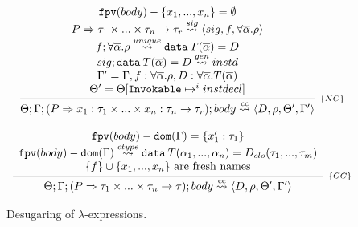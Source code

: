 \documentclass[a4paper, 11pt]{article}
\begin{document}
\begin{figure}[H]
  \[
    \begin{array}{c}
      \infer[_{\{NC\}}]
            {\Theta;\Gamma;(P \Rightarrow x_1 : \tau_1\times ... \times x_n : \tau_n \to \tau_r); body \cc \langle D, \rho, \Theta', \Gamma' \rangle}
            {\begin{array}{c}
              \fpv(body) - \{x_1, ...,x_n \} = \emptyset\\
              P \Rightarrow \tau_1\times ... \times \tau_n \to \tau_r \sig \langle sig, f, \forall \overline{\alpha} . \rho \rangle\\ 
              f ; \forall \overline{\alpha}. \rho \unique \mathtt{data}\:T(\overline{\alpha}) = D\\
              sig ; \mathtt{data}\:T(\overline{\alpha}) = D \geninvoke instd\\ 
              \Gamma' = \Gamma, f : \forall\overline{\alpha}.\rho, D : \forall\overline{\alpha} . T(\overline{\alpha})\\
              \Theta' = \Theta [\invokable \mapsto^i instdecl]
             \end{array}}
 \\ \\
      \infer[_{\{CC\}}]
            {\Theta;\Gamma;(P \Rightarrow \tau_1\times ... \times \tau_n \to \tau); body \cc \langle D, \rho, \Theta', \Gamma' \rangle}
            {\begin{array}{c}
              \fpv(body) - \dom{\Gamma} = \{x'_1 : \tau_1\}\\ 
              \fpv(body) - \dom{\Gamma} \closuretype \mathtt{data}\:T(\alpha_1,...,\alpha_n) = D_{clo}(\tau_1,...,\tau_m)\\  
              \{f\}\cup \{x_1, ..., x_n\}\text{ are fresh names} \\
             \end{array}}
    \end{array}
  \]
  \centering
  \caption{Desugaring of $\lambda$-expressions.}
  \label{fig:closurepred}
\end{figure}
\end{document}
